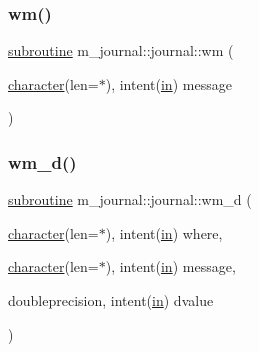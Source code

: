 \mbox{\label{interfacem__journal_1_1journal_ae9fcc7d13b5f423e200acaf60ab50975}} 
\subsubsection{\texorpdfstring{wm()}{wm()}}
{\footnotesize\ttfamily \hyperlink{M__stopwatch_83_8txt_acfbcff50169d691ff02d4a123ed70482}{subroutine} m\+\_\+journal\+::journal\+::wm (\begin{DoxyParamCaption}\item[{\hyperlink{option__stopwatch_83_8txt_abd4b21fbbd175834027b5224bfe97e66}{character}(len=$\ast$), intent(\hyperlink{M__journal_83_8txt_afce72651d1eed785a2132bee863b2f38}{in})}]{message }\end{DoxyParamCaption})\hspace{0.3cm}{\ttfamily [private]}}

\mbox{\label{interfacem__journal_1_1journal_a9a977858d9fde59867ceae2beecd6957}} 
\subsubsection{\texorpdfstring{wm\+\_\+d()}{wm\_d()}}
{\footnotesize\ttfamily \hyperlink{M__stopwatch_83_8txt_acfbcff50169d691ff02d4a123ed70482}{subroutine} m\+\_\+journal\+::journal\+::wm\+\_\+d (\begin{DoxyParamCaption}\item[{\hyperlink{option__stopwatch_83_8txt_abd4b21fbbd175834027b5224bfe97e66}{character}(len=$\ast$), intent(\hyperlink{M__journal_83_8txt_afce72651d1eed785a2132bee863b2f38}{in})}]{where,  }\item[{\hyperlink{option__stopwatch_83_8txt_abd4b21fbbd175834027b5224bfe97e66}{character}(len=$\ast$), intent(\hyperlink{M__journal_83_8txt_afce72651d1eed785a2132bee863b2f38}{in})}]{message,  }\item[{doubleprecision, intent(\hyperlink{M__journal_83_8txt_afce72651d1eed785a2132bee863b2f38}{in})}]{dvalue }\end{DoxyParamCaption})\hspace{0.3cm}{\ttfamily [private]}}

